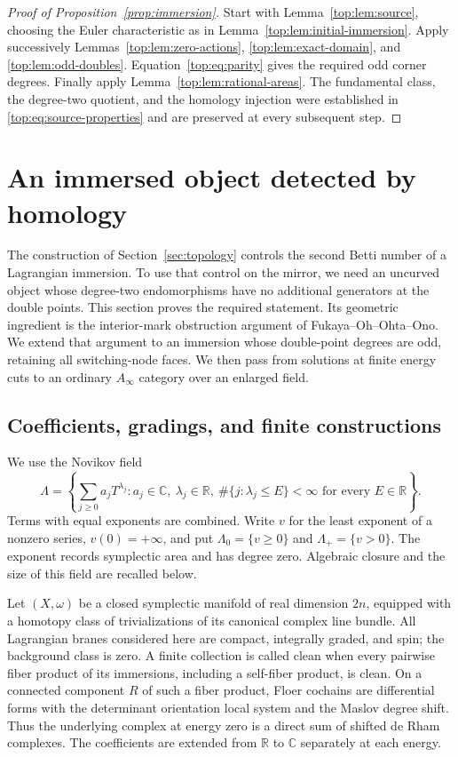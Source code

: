 \documentclass[11pt]{article}
\numberwithin{equation}{section}
\theoremstyle{definition}
\theoremstyle{remark}
\newcommand{\C}{\mathbb C}
\newcommand{\R}{\mathbb R}
\begin{document}
\begin{proof}[Proof of Proposition~\ref{prop:immersion}]
Start with Lemma~\ref{top:lem:source}, choosing the Euler
characteristic as in Lemma~\ref{top:lem:initial-immersion}.
Apply successively Lemmas~\ref{top:lem:zero-actions},
\ref{top:lem:exact-domain}, and \ref{top:lem:odd-doubles}.
Equation~\eqref{top:eq:parity} gives the required odd
corner degrees.  Finally apply
Lemma~\ref{top:lem:rational-areas}.  The fundamental
class, the degree-two quotient, and the homology
injection were established in
\eqref{top:eq:source-properties} and are preserved
at every subsequent step.
\end{proof}


\section{An immersed object detected by homology}
\label{sec:floer}

The construction of Section~\ref{sec:topology} controls the second Betti
number of a Lagrangian immersion.  To use that control on the mirror, we
need an uncurved object whose degree-two endomorphisms have no additional
generators at the double points.  This section proves the required
statement.  Its geometric ingredient is the interior-mark obstruction
argument of Fukaya--Oh--Ohta--Ono.  We extend that argument to an immersion
whose double-point degrees are odd, retaining all switching-node faces.
We then pass from solutions at finite energy cuts to an ordinary
$A_\infty$ category over an enlarged field.

\subsection{Coefficients, gradings, and finite constructions}
\label{subsec:floer-foundations}

We use the Novikov field
\[
 \Lambda=\left\{\sum_{j\geq0}a_jT^{\lambda_j}:
 a_j\in\C,\ \lambda_j\in\R,\
 \#\{j:\lambda_j\leq E\}<\infty\text{ for every }E\in\R\right\}.
\]
Terms with equal exponents are combined.  Write $v$ for the least exponent
of a nonzero series, $v(0)=+\infty$, and put
$\Lambda_0=\{v\geq0\}$ and $\Lambda_+=\{v>0\}$.
The exponent records symplectic area and has degree zero.  Algebraic
closure and the size of this field are recalled below.

Let $(X,\omega)$ be a closed symplectic manifold of real dimension $2n$,
equipped with a homotopy class of trivializations of its canonical complex
line bundle.  All Lagrangian branes considered here are compact,
integrally graded, and spin; the background class is zero.  A finite
collection is called clean when every pairwise fiber product of its
immersions, including a self-fiber product, is clean.  On a connected
component $R$ of such a fiber product, Floer cochains are differential
forms with the determinant orientation local system and the Maslov
degree shift.  Thus the underlying complex at energy zero is a direct
sum of shifted de Rham complexes.  The coefficients are extended from
$\R$ to $\C$ separately at each energy.
\end{document}
